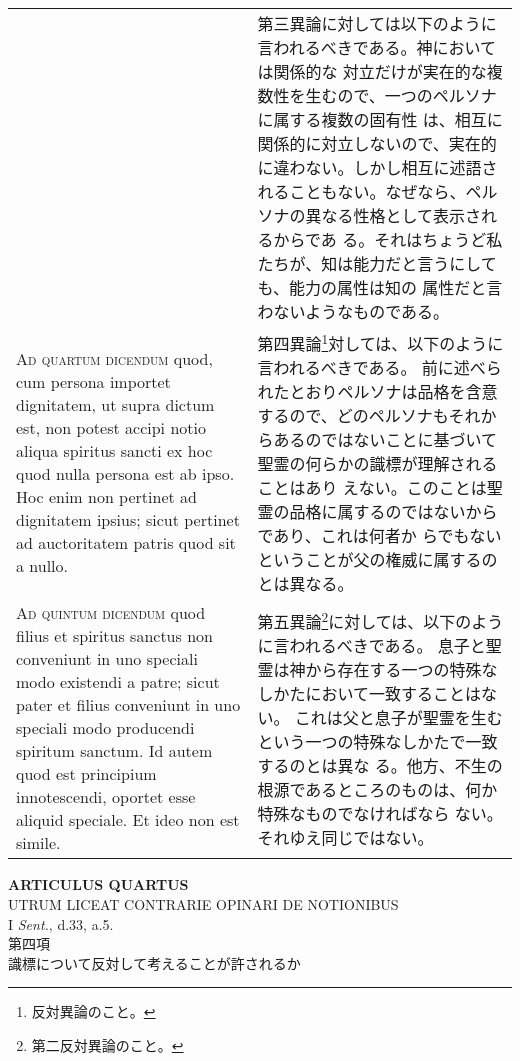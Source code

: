 \documentclass[10pt]{jsarticle} %
\begin{document}
\begin{longtable}{p{21em}p{21em}}
&

第三異論に対しては以下のように言われるべきである。神においては関係的な
対立だけが実在的な複数性を生むので、一つのペルソナに属する複数の固有性
は、相互に関係的に対立しないので、実在的に違わない。しかし相互に述語さ
れることもない。なぜなら、ペルソナの異なる性格として表示されるからであ
る。それはちょうど私たちが、知は能力だと言うにしても、能力の属性は知の
属性だと言わないようなものである。


\\



{\scshape Ad quartum dicendum} quod, cum persona importet dignitatem, ut supra
dictum est, non potest accipi notio aliqua spiritus sancti ex hoc quod
nulla persona est ab ipso. Hoc enim non pertinet ad dignitatem ipsius;
sicut pertinet ad auctoritatem patris quod sit a nullo.

&

第四異論\footnote{反対異論のこと。}対しては、以下のように言われるべきである。
前に述べられたとおりペルソナは品格を含意するので、どのペルソナもそれか
らあるのではないことに基づいて聖霊の何らかの識標が理解されることはあり
えない。このことは聖霊の品格に属するのではないからであり、これは何者か
らでもないということが父の権威に属するのとは異なる。

\\



{\scshape Ad quintum dicendum} quod filius et spiritus sanctus non conveniunt in
uno speciali modo existendi a patre; sicut pater et filius conveniunt
in uno speciali modo producendi spiritum sanctum. Id autem quod est
principium innotescendi, oportet esse aliquid speciale. Et ideo non
est simile.

&

第五異論\footnote{第二反対異論のこと。}に対しては、以下のように言われるべきである。
息子と聖霊は神から存在する一つの特殊なしかたにおいて一致することはない。
これは父と息子が聖霊を生むという一つの特殊なしかたで一致するのとは異な
る。他方、不生の根源であるところのものは、何か特殊なものでなければなら
ない。それゆえ同じではない。
\end{longtable}
\newpage



\begin{center}
{\Large {\bf ARTICULUS QUARTUS}}\\
{\large UTRUM LICEAT CONTRARIE OPINARI DE NOTIONIBUS}\\
{\footnotesize I {\itshape Sent.}, d.33, a.5.}\\
{\Large 第四項\\識標について反対して考えることが許されるか}
\end{center}
\end{document}
